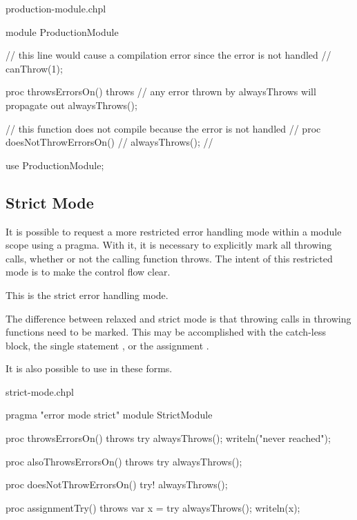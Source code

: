 \begin{chapelexample}{production-module.chpl}
\begin{chapel}
module ProductionModule {
  // this line would cause a compilation error since the error is not handled
  // canThrow(1);

  proc throwsErrorsOn() throws {
    // any error thrown by alwaysThrows will propagate out
    alwaysThrows();
  }

  // this function does not compile because the error is not handled
  // proc doesNotThrowErrorsOn() {
  //   alwaysThrows();
  // }
}

use ProductionModule;
\end{chapel}
\begin{chapelpost}
\end{chapelpost}
\begin{chapeloutput}
\end{chapeloutput}
\end{chapelexample}


\subsection{Strict Mode}
\label{Errors_Strict_Mode}

It is possible to request a more restricted error handling mode within a
module scope using a pragma. With it, it is necessary to explicitly mark all
throwing calls, whether or not the calling function throws. The intent of
this restricted mode is to make the control flow clear.

This is the strict error handling mode.

The difference between relaxed and strict mode is that throwing calls
in throwing functions need to be marked. This may be accomplished
with the catch-less  block, the single statement , or
the assignment .

It is also possible to use  in these forms.

\begin{chapelexample}{strict-mode.chpl}
\begin{chapel}
pragma "error mode strict"
module StrictModule {
  proc throwsErrorsOn() throws {
    try {
      alwaysThrows();
      writeln("never reached");
    }
  }

  proc alsoThrowsErrorsOn() throws {
    try alwaysThrows();
  }

  proc doesNotThrowErrorsOn() {
    try! alwaysThrows();
  }

  proc assignmentTry() throws {
    var x = try alwaysThrows();
    writeln(x);
  }
}
\end{chapel}
\begin{chapelpost}
\end{chapelpost}
\begin{chapeloutput}
\end{chapeloutput}
\end{chapelexample}

